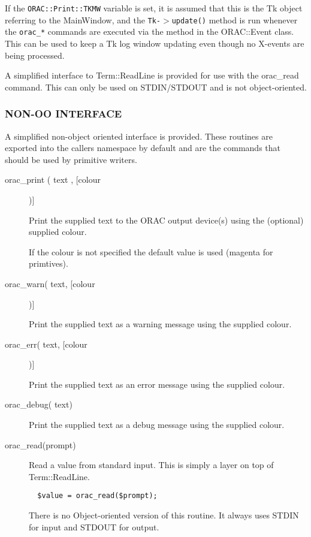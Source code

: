If the \texttt{ORAC::Print::TKMW} variable is set, it is assumed that this
is the Tk object referring to the MainWindow, and the
\texttt{Tk-$>$update()} method is run whenever the \texttt{orac\_*} commands are
executed via the method in the ORAC::Event class.  This can be used to 
keep a Tk log window updating even though no X-events are being processed.



A simplified interface to Term::ReadLine is provided for use with
the orac\_read command. This can only be used on STDIN/STDOUT and
is not object-oriented.

\subsubsection*{NON-OO INTERFACE\label{ORAC::Print_NON-OO_INTERFACE}}

A simplified non-object oriented interface is provided.
These routines are exported into the callers namespace by default
and are the commands that should be used by primitive writers.

\begin{description}
\item[orac\_print ( text , [colour])] \mbox{}

Print the supplied text to the ORAC output device(s)
using the (optional) supplied colour.



If the colour is not specified the default value is used (magenta
for primtives).

\item[orac\_warn( text, [colour])] \mbox{}

Print the supplied text as a warning message using the supplied
colour.

\item[orac\_err( text, [colour])] \mbox{}

Print the supplied text as an error message using the supplied
colour.

\item[orac\_debug( text)] \mbox{}

Print the supplied text as a debug message using the supplied
colour.

\item[orac\_read(prompt)] \mbox{}

Read a value from standard input. This is simply a layer
on top of Term::ReadLine.

\begin{verbatim}
  $value = orac_read($prompt);
\end{verbatim}


There is no Object-oriented version of this routine. It always
uses STDIN for input and STDOUT for output.

\end{description}

